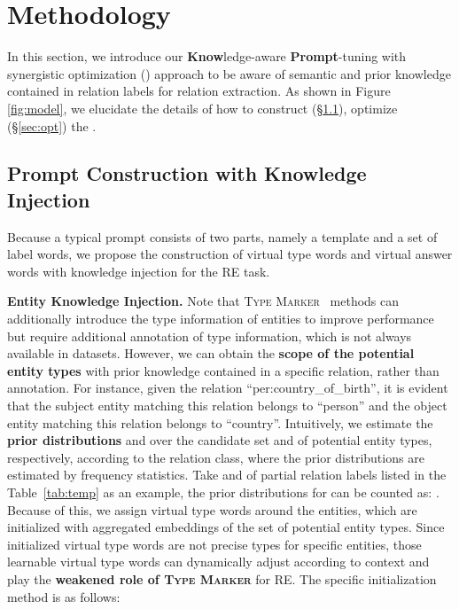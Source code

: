 \documentclass[sigconf]{acmart}
\begin{document}
\section{Methodology}
In this section, we  introduce our \textbf{Know}ledge-aware \textbf{Prompt}-tuning with synergistic optimization ({\ours}) approach to be aware of semantic and prior knowledge contained in relation labels for relation extraction. As shown in Figure \ref{fig:model},
we elucidate the details of how to construct (\S \ref{subsec:cons}), optimize (\S \ref{sec:opt}) the {\ours}.


 

\subsection{Prompt Construction with Knowledge Injection}
\label{subsec:cons}
Because a typical prompt consists of two parts, namely a template and a set of label words, we propose the construction of virtual type words and virtual answer words with knowledge injection for the RE task.

\textbf{Entity Knowledge Injection.}
Note that \textsc{Type Marker}~\cite{DBLP:journals/corr/abs-2102-01373} methods can additionally introduce the type information of entities to improve performance but require additional annotation of type information, which is not always available in datasets.
However, we can obtain the \textbf{scope of the potential entity types} with prior knowledge contained in a specific relation, rather than annotation.
For instance, given the relation ``per:country\_of\_birth'', it is evident that the subject entity matching this relation belongs to ``person'' and the object entity matching this relation belongs to ``country''. 
Intuitively, we estimate the \textbf{prior distributions}  and  over the candidate set  and  of  potential entity types, respectively, according to the relation class, where the prior distributions are estimated by frequency statistics. Take  and  of partial relation labels listed in the Table~\ref{tab:temp} as an example, the prior distributions for  can be counted as:  .
Because of this, we assign virtual type words around the entities, which are initialized with aggregated embeddings of the set of potential entity types. 
Since initialized virtual type words are not precise types for specific entities, those learnable virtual type words can dynamically adjust according to context and play the \textbf{weakened role of \textsc{Type Marker}}  for RE. 
The specific initialization method is as follows:
\end{document}
